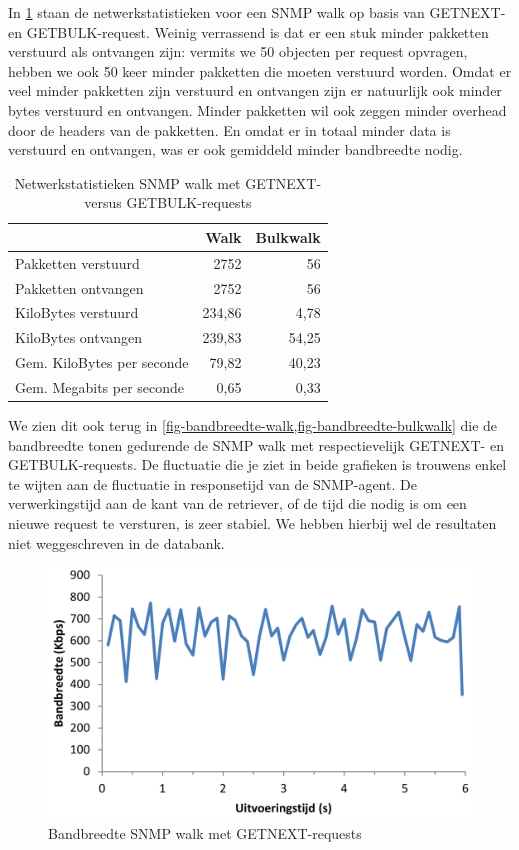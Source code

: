 In \cref{tabel-bandbreedte-walk-vs-bulk} staan de netwerkstatistieken voor een SNMP walk op basis van GETNEXT- en GETBULK-request.
Weinig verrassend is dat er een stuk minder pakketten verstuurd als ontvangen zijn:
vermits we 50 objecten per request opvragen, hebben we ook 50 keer minder pakketten die moeten verstuurd worden.
Omdat er veel minder pakketten zijn verstuurd en ontvangen zijn er natuurlijk ook minder bytes verstuurd en ontvangen.
Minder pakketten wil ook zeggen minder overhead door de headers van de pakketten.
En omdat er in totaal minder data is verstuurd en ontvangen, was er ook gemiddeld minder bandbreedte nodig.


\begin{table}[h]
\centering
\begin{tabular}{@{}lrr@{}}
\toprule
                           & Walk   & Bulkwalk \\ \midrule
Pakketten verstuurd        & 2752   & 56       \\
Pakketten ontvangen        & 2752   & 56       \\
KiloBytes verstuurd        & 234,86 & 4,78     \\
KiloBytes ontvangen        & 239,83 & 54,25    \\
Gem. KiloBytes per seconde & 79,82  & 40,23    \\
Gem. Megabits per seconde  & 0,65   & 0,33     \\ \bottomrule
\end{tabular}
\caption{Netwerkstatistieken SNMP walk met GETNEXT- versus GETBULK-requests}
\label{tabel-bandbreedte-walk-vs-bulk}
\end{table}

We zien dit ook terug in \cref{fig-bandbreedte-walk,fig-bandbreedte-bulkwalk} die de bandbreedte tonen gedurende
de SNMP walk met respectievelijk GETNEXT- en GETBULK-requests.
De fluctuatie die je ziet in beide grafieken is trouwens enkel te wijten aan de fluctuatie in responsetijd van de SNMP-agent.
De verwerkingstijd aan de kant van de retriever, of de tijd die nodig is om een nieuwe request te versturen, is zeer stabiel.
We hebben hierbij wel de resultaten niet weggeschreven in de databank.

\begin{figure}[h]
	\centering
	\includegraphics[scale=0.40]{figures/bandbreedte/snmpwalk}
	\caption{Bandbreedte SNMP walk met GETNEXT-requests}
	\label{fig-bandbreedte-walk}
\end{figure}

